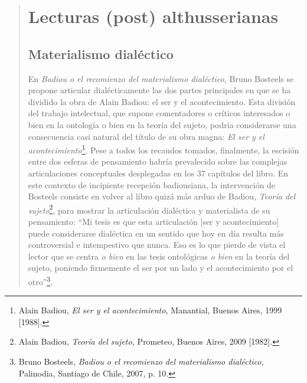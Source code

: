 \begin{quote}
\section{Lecturas (post) althusserianas}

\subsection{Materialismo dialéctico}

En \emph{Badiou o el recomienzo del materialismo dialéctico,} Bruno Bosteels se propone articular dialécticamente las dos partes principales en que se ha dividido la obra de Alain Badiou: el ser y el acontecimiento. Esta división del trabajo intelectual, que supone comentadores o críticos interesados o bien en la ontología o bien en la teoría del sujeto, podría considerarse una consecuencia casi natural del título de su obra magna: \emph{El ser y el acontecimiento}\footnote{Alain Badiou, \emph{El ser y el acontecimiento,} Manantial, Buenos Aires, 1999 {[}1988{]}.}. Pese a todos los recaudos tomados, finalmente, la escisión entre dos esferas de pensamiento habría prevalecido sobre las complejas articulaciones conceptuales desplegadas en los 37 capítulos del libro. En este contexto de incipiente recepción badiousiana, la intervención de Bosteels consiste en volver al libro quizá más arduo de Badiou, \emph{Teoría del sujeto}\footnote{Alain Badiou, \emph{Teoría del sujeto,} Prometeo, Buenos Aires, 2009 {[}1982{]}.}, para mostrar la articulación dialéctica y materialista de su pensamiento: \enquote{Mi tesis es que esta articulación {[}ser y acontecimiento{]} puede considerarse dialéctica en un sentido que hoy en día resulta más controversial e intempestivo que nunca. Eso es lo que pierde de vista el lector que se centra \emph{o bien} en las tesis ontológicas \emph{o bien} en la teoría del sujeto, poniendo firmemente el ser por un lado y el acontecimiento por el otro}\footnote{Bruno Bosteels, \emph{Badiou o el recomienzo del materialismo dialéctico,} Palinodia, Santiago de Chile, 2007, p. 10.}.


\end{quote}
